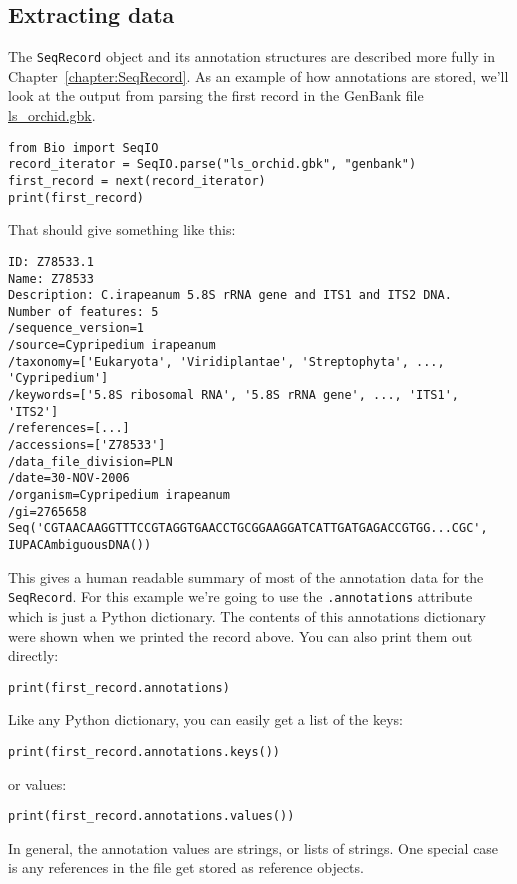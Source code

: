 \subsection{Extracting data}

The \verb|SeqRecord| object and its annotation structures are described more fully in
Chapter~\ref{chapter:SeqRecord}.  As an example of how annotations are stored, we'll look at the output from parsing the first record in the GenBank file \href{https://raw.githubusercontent.com/biopython/biopython/master/Doc/examples/ls_orchid.gbk}{ls\_orchid.gbk}.

\begin{verbatim}
from Bio import SeqIO
record_iterator = SeqIO.parse("ls_orchid.gbk", "genbank")
first_record = next(record_iterator)
print(first_record)
\end{verbatim}

\noindent That should give something like this:

\begin{verbatim}
ID: Z78533.1
Name: Z78533
Description: C.irapeanum 5.8S rRNA gene and ITS1 and ITS2 DNA.
Number of features: 5
/sequence_version=1
/source=Cypripedium irapeanum
/taxonomy=['Eukaryota', 'Viridiplantae', 'Streptophyta', ..., 'Cypripedium']
/keywords=['5.8S ribosomal RNA', '5.8S rRNA gene', ..., 'ITS1', 'ITS2']
/references=[...]
/accessions=['Z78533']
/data_file_division=PLN
/date=30-NOV-2006
/organism=Cypripedium irapeanum
/gi=2765658
Seq('CGTAACAAGGTTTCCGTAGGTGAACCTGCGGAAGGATCATTGATGAGACCGTGG...CGC', IUPACAmbiguousDNA())
\end{verbatim}

This gives a human readable summary of most of the annotation data for the \verb|SeqRecord|.
For this example we're going to use the \verb|.annotations| attribute which is just a Python dictionary.
The contents of this annotations dictionary were shown when we printed the record above.
You can also print them out directly:
\begin{verbatim}
print(first_record.annotations)
\end{verbatim}
\noindent Like any Python dictionary, you can easily get a list of the keys:
\begin{verbatim}
print(first_record.annotations.keys())
\end{verbatim}
\noindent or values:
\begin{verbatim}
print(first_record.annotations.values())
\end{verbatim}

In general, the annotation values are strings, or lists of strings.  One special case is any references in the file get stored as reference objects.

